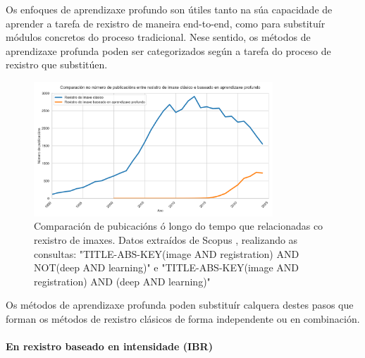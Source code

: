 Os enfoques de aprendizaxe profundo son útiles tanto na súa capacidade de aprender a tarefa de rexistro de maneira end-to-end, como para substituír módulos concretos do proceso tradicional.
Nese sentido, os métodos de aprendizaxe profunda poden ser categorizados según a tarefa do proceso de rexistro que substitúen.

\begin{figure}[tbp]
\centering
\includegraphics[width=0.8\textwidth]{imaxes/methods_comp.png}
\caption{Comparación de pubicacións ó longo do tempo que relacionadas co rexistro de imaxes. Datos extraídos de Scopus \cite{scopus}, realizando as consultas: "TITLE-ABS-KEY(image AND registration) AND NOT(deep AND learning)" e "TITLE-ABS-KEY(image AND registration) AND (deep AND learning)"}
\label{fig:method_comp}
\end{figure}

Os métodos de aprendizaxe profunda poden substituír calquera destes pasos que forman os métodos de rexistro clásicos de forma independente ou en combinación.

\paragraph{En rexistro baseado en intensidade (IBR)}
\label{par:IBR_substitution}

